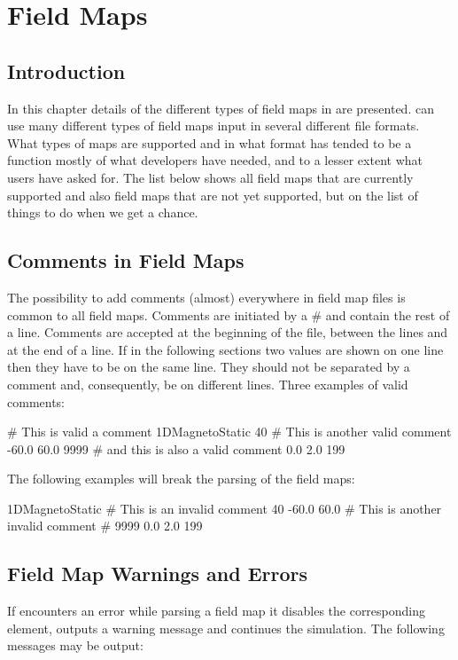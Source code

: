 

\chapter{\opalt Field Maps}

\section{Introduction}
\label{chp:app_fieldmaps}
In this chapter details of the different types of field maps in \opalt are presented. \opalt can use many different types of
field maps input in several different file formats. What types of maps are supported and in what format has tended to be a function
mostly of what developers have needed, and to a lesser extent what users have asked for. The list below shows all field maps that
are currently supported and also field maps that are not yet supported, but on the list of things to do when we get a chance.

\section{Comments in Field Maps}
The possibility to add comments (almost)
everywhere in field map files is common to all field maps. Comments are initiated by a \# and contain the rest of a line. Comments are
accepted at the beginning of the file, between the lines and at the end of a line. If in the following sections two values are
shown on one line then they have to be on the same line. They should not be separated by a comment and, consequently, be on
different lines. Three examples of valid comments:
\begin{example}
# This is valid a comment
1DMagnetoStatic 40 # This is another valid comment
-60.0 60.0 9999
  # and this is also a valid comment
0.0 2.0 199
\end{example}
The following examples will break the parsing of the field maps:
\begin{example}
1DMagnetoStatic # This is an invalid comment
40
-60.0 60.0 # This is another invalid comment # 9999
0.0 2.0 199
\end{example}

\section{Field Map Warnings and Errors}
If \opalt encounters an error while parsing a field map it disables the corresponding element, outputs a warning message and
continues the simulation. The following messages may be output:

